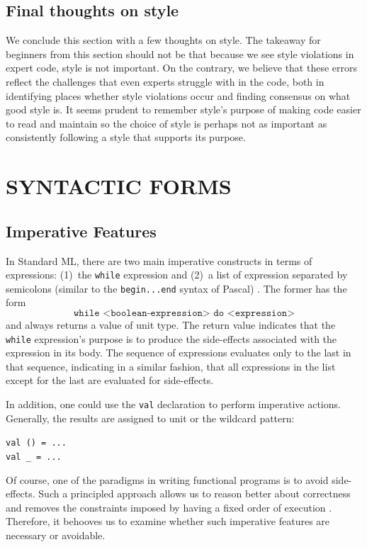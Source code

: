\documentclass[12pt,abstracton]{scrartcl}
\begin{document}
\subsection{Final thoughts on style}\label{subsec:stylethoughts}
We conclude this section with a few thoughts on style.
The takeaway for beginners from this section should not be
that because we see style violations in expert code,
style is not important. On the contrary, we believe that
these errors reflect the challenges that even experts
struggle with in the code, both in identifying places
whether style violations occur and finding consensus on
what good style is. It seems prudent to
remember style's purpose of making code easier to read
and maintain so the choice of style is perhaps not as important as consistently following
a style that supports its purpose.
\section{SYNTACTIC FORMS}\label{sec:syntax}
\subsection{Imperative Features}\label{subsec:imper}
In Standard ML, there are two main imperative constructs in terms of expressions:
(1)~the \texttt{while} expression and (2)~a list of expression separated by semicolons (similar to the \texttt{begin...end} syntax of Pascal) \cite{Ull98}.
The former has the form
\[\texttt{while <boolean-expression> do <expression>}\] and always returns a value of unit type.
The return value indicates that the \texttt{while} expression's purpose is to produce the side-effects associated
with the expression in its body. The sequence of expressions evaluates only to the last in that sequence, indicating
in a similar fashion, that all expressions in the list except for the last are evaluated for side-effects.

In addition, one could use the \texttt{val} declaration to perform imperative actions.
Generally, the results are assigned to unit or the wildcard pattern:
\begin{center}
\texttt{val () = ...}\\
\texttt{val \_ = ...}
\end{center}
Of course, one of the paradigms in writing functional programs is to avoid side-effects.
Such a principled approach allows us to reason better about correctness and
removes the constraints imposed by having a fixed order of execution \cite{Hug90}. Therefore,
it behooves us to examine whether such imperative features are necessary or avoidable.
\end{document}
